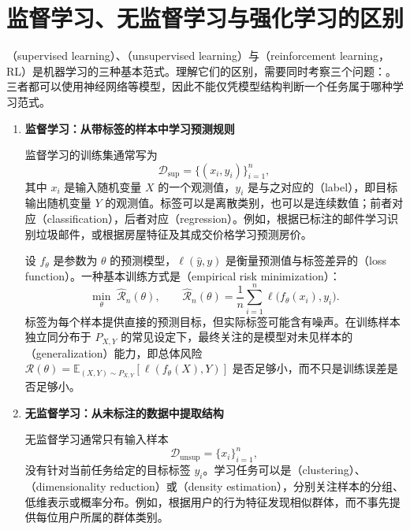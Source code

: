 \documentclass[UTF8,12pt,a4paper,fontset=fandol]{ctexbook}
\begin{document}
\section{监督学习、无监督学习与强化学习的区别}
\label{sec:learning-paradigms}

（supervised learning）、（unsupervised learning）与（reinforcement learning，RL）是机器学习的三种基本范式。理解它们的区别，需要同时考察三个问题：。三者都可以使用神经网络等模型，因此不能仅凭模型结构判断一个任务属于哪种学习范式。

\begin{enumerate}
  \item \textbf{监督学习：从带标签的样本中学习预测规则}

  监督学习的训练集通常写为
  \[
    \mathcal{D}_{\mathrm{sup}}=\{(x_i,y_i)\}_{i=1}^{n},
  \]
  其中 $x_i$ 是输入随机变量 $X$ 的一个观测值，$y_i$ 是与之对应的（label），即目标输出随机变量 $Y$ 的观测值。标签可以是离散类别，也可以是连续数值；前者对应（classification），后者对应（regression）。例如，根据已标注的邮件学习识别垃圾邮件，或根据房屋特征及其成交价格学习预测房价。

  设 $f_\theta$ 是参数为 $\theta$ 的预测模型，$\ell(\widehat y,y)$ 是衡量预测值与标签差异的（loss function）。一种基本训练方式是（empirical risk minimization）：
  \begin{equation}
    \min_{\theta}\;\widehat{\mathcal{R}}_n(\theta),
    \qquad
    \widehat{\mathcal{R}}_n(\theta)
    =\frac{1}{n}\sum_{i=1}^{n}\ell\bigl(f_\theta(x_i),y_i\bigr).
  \end{equation}
  标签为每个样本提供直接的预测目标，但实际标签可能含有噪声。在训练样本独立同分布于 $P_{X,Y}$ 的常见设定下，最终关注的是模型对未见样本的（generalization）能力，即总体风险 $\mathcal{R}(\theta)=\mathbb{E}_{(X,Y)\sim P_{X,Y}}[\ell(f_\theta(X),Y)]$ 是否足够小，而不只是训练误差是否足够小。

  \item \textbf{无监督学习：从未标注的数据中提取结构}\nopagebreak

  无监督学习通常只有输入样本
  \[
    \mathcal{D}_{\mathrm{unsup}}=\{x_i\}_{i=1}^{n},
  \]
  没有针对当前任务给定的目标标签 $y_i$。学习任务可以是（clustering）、（dimensionality reduction）或（density estimation），分别关注样本的分组、低维表示或概率分布。例如，根据用户的行为特征发现相似群体，而不事先提供每位用户所属的群体类别。


\end{enumerate}
\end{document}

